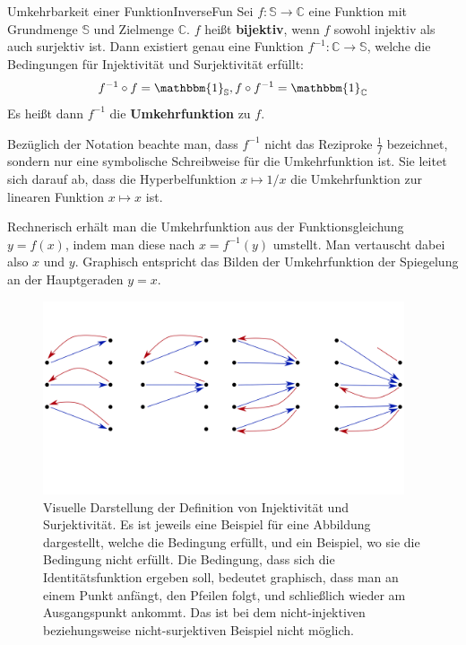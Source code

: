 \begin{statement}{Umkehrbarkeit einer Funktion}{InverseFun}
    Sei $f: \mathbb{S} \to \mathbb{C}$ eine Funktion mit Grundmenge $\mathbb{S}$ und Zielmenge $\mathbb{C}$. $f$ heißt \textbf{bijektiv}, wenn $f$ sowohl injektiv als auch surjektiv ist. Dann existiert genau eine Funktion $f^{-1}: \mathbb{C} \to \mathbb{S}$, welche die Bedingungen für Injektivität und Surjektivität erfüllt:
    $$
    f^{-1} \circ f = \mathbbm{1}_\mathbb{S}, f \circ f^{-1} = \mathbbm{1}_\mathbb{C}
    $$
    Es heißt dann $f^{-1}$ die \textbf{Umkehrfunktion} zu $f$.
\end{statement}

Bezüglich der Notation beachte man, dass $f^{-1}$ nicht das Reziproke $\frac{1}{f}$ bezeichnet, sondern nur eine symbolische Schreibweise für die Umkehrfunktion ist. Sie leitet sich darauf ab, dass die Hyperbelfunktion $x \mapsto 1/x$ die Umkehrfunktion zur linearen Funktion $x \mapsto x$ ist.

Rechnerisch erhält man die Umkehrfunktion aus der Funktionsgleichung $y = f(x)$, indem man diese nach $x = f^{-1}(y)$ umstellt. Man vertauscht dabei also $x$ und $y$. Graphisch entspricht das Bilden der Umkehrfunktion der Spiegelung an der Hauptgeraden $y=x$.

\begin{figure}
    \centering
    \includegraphics[width=0.95\textwidth]{./svg/injective-surjective}
    \caption[Injektivität und Surjektivität]{Visuelle Darstellung der Definition von Injektivität und Surjektivität. Es ist jeweils eine Beispiel für eine Abbildung dargestellt, welche die Bedingung erfüllt, und ein Beispiel, wo sie die Bedingung nicht erfüllt. Die Bedingung, dass sich die Identitätsfunktion ergeben soll, bedeutet graphisch, dass man an einem Punkt anfängt, den Pfeilen folgt, und schließlich wieder am Ausgangspunkt ankommt. Das ist bei dem nicht-injektiven beziehungsweise nicht-surjektiven Beispiel nicht möglich.}
    \label{fig:InjectSurject}
\end{figure}


